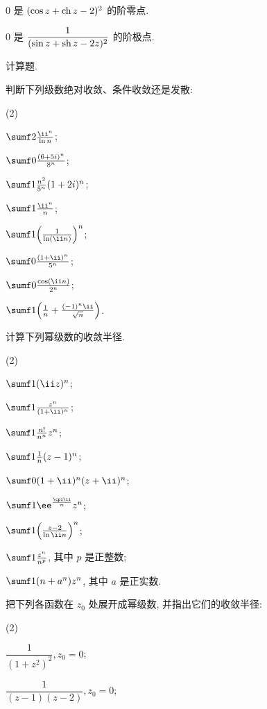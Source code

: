\begin{homework}
\begin{homework}
    \item $0$ 是 $(\cos z+\operatorname{ch} z-2)^2$ 的\fillblank{}阶零点.
    \item $0$ 是 $\dfrac1{(\sin z+\operatorname{sh} z-2z)^2}$ 的\fillblank{}阶极点.
  \end{homework}
  \item 计算题.
  \begin{homework}
    \item 判断下列级数绝对收敛、条件收敛还是发散:
      \begin{subhomework}(2)
        \item $\sumf2 \frac{\ii^n}{\ln n}$;
        \item $\sumf0 \frac{(6+5i)^n}{8^n}$;
        \item $\sumf1 \frac{n^2}{5^n}(1+2i)^n$;
        \item $\sumf1 \frac{\ii^n}{n}$;
        \item $\sumf1 \Bigl(\frac{1}{\ln (\ii n)}\Bigr)^n$;
        \item $\sumf0 \frac{(1+\ii)^n}{5^n}$;
        \item $\sumf0 \frac{\cos(\ii n)}{2^n}$;
        \item $\sumf1 \Bigl(\frac1n+\frac{(-1)^n\ii}{\sqrt n}\Bigr)$.
      \end{subhomework}
    \item 计算下列幂级数的收敛半径.
    \begin{subhomework}(2)
      \item $\sumf1 (\ii z)^n$;
      \item $\sumf1 \frac{z^n}{(1+\ii)^n}$;
      \item $\sumf1 \frac{n!}{n^n}z^n$;
      \item $\sumf1 \frac1n(z-1)^n$;
      \item $\sumf0 (1+\ii)^n(z+\ii)^n$;
      \item $\sumf1 \ee^{\frac{\cpi\ii}n}z^n$;
      \item $\sumf1 \Bigl(\frac{z-2}{\ln{\ii n}}\Bigr)^n$;
      \item $\sumf1 \frac{z^n}{n^p}$, 其中 $p$ 是正整数;
      \item $\sumf1 (n+a^n)z^n$, 其中 $a$ 是正实数.
    \end{subhomework}
    \item 把下列各函数在 $z_0$ 处展开成幂级数, 并指出它们的收敛半径:
    \begin{subhomework}(2)
      \item $\dfrac1{(1+z^2)^2}, z_0=0$;
      \item $\dfrac{1}{(z-1)(z-2)}, z_0=0$;

\end{subhomework}
\end{homework}
\end{homework}
